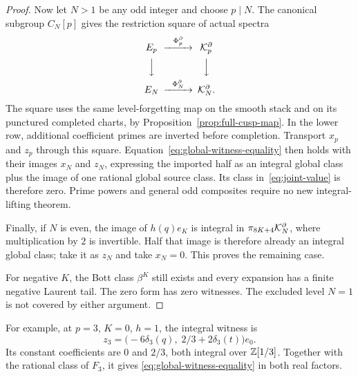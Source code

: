 \begin{proof}
Now let $N>1$ be any odd integer and choose $p\mid N$. The canonical
subgroup $C_N[p]$ gives the restriction square of actual spectra
\begin{equation}\label{eq:prime-to-composite}
 \begin{CD}
 E_p @>{\Phi_p^\partial}>>\cK_p^\partial\\
 @VVV @VVV\\
 E_N @>{\Phi_N^\partial}>>\cK_N^\partial.
 \end{CD}
\end{equation}
The square uses the same level-forgetting map on the smooth stack
and on its punctured completed charts, by
Proposition~\ref{prop:full-cusp-map}. In the lower row, additional
coefficient primes are inverted before completion. Transport $x_p$
and $z_p$ through this square. Equation~\eqref{eq:global-witness-equality}
then holds with their images $x_N$ and $z_N$, expressing the imported
half as an integral global class plus the image of one rational global
source class. Its class in~\eqref{eq:joint-value} is therefore zero.
Prime powers and general odd composites require no new integral-lifting
theorem.

Finally, if $N$ is even, the image of $h(q)e_K$ is integral in
$\pi_{8K+4}\mathcal K_N^\partial$, where multiplication by $2$ is invertible.
Half that image is therefore already an integral global class; take
it as $z_N$ and take $x_N=0$. This proves the remaining case.

For negative $K$, the Bott class $\beta^K$ still exists and every
expansion has a finite negative Laurent tail. The zero form has zero
witnesses. The excluded level $N=1$ is not covered by either argument.
\end{proof}

For example, at $p=3$, $K=0$, $h=1$, the integral witness is
\[
 z_3=\bigl(-6\delta_3(q),\;2/3+2\delta_3(t)\bigr)e_0.
\]
Its constant coefficients are $0$ and $2/3$, both integral over
$\mathbb Z[1/3]$. Together with the rational class of $F_3$, it gives
\eqref{eq:global-witness-equality} in both real factors.

